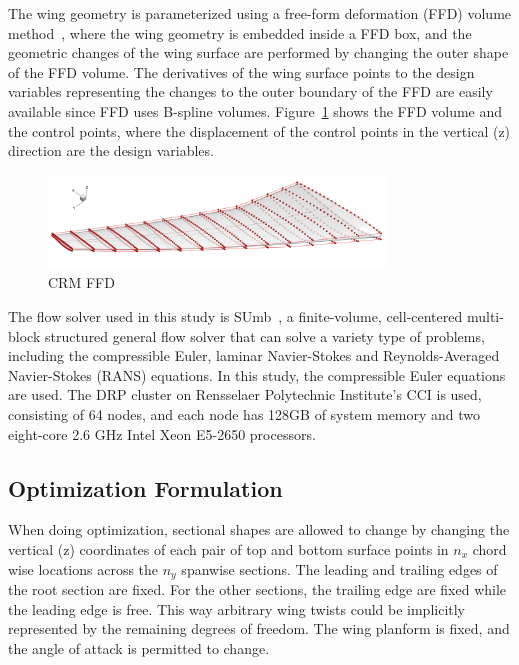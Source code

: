 The wing geometry is parameterized using a free-form deformation (FFD) volume method~\cite{Kenway:2010:C}, where the wing geometry is embedded inside a FFD box, and the geometric changes of the wing surface are performed by changing the outer shape of the FFD volume. The derivatives of the wing surface points to the design variables representing the changes to the outer boundary of the FFD are easily available since FFD uses B-spline volumes. Figure~\ref{fig:crm_ffd} shows the FFD volume and the control points, where the displacement of the control points in the vertical (z) direction are the design variables. 

 \begin{figure}[tbp]
  \centering
  \includegraphics[clip,width=0.8\textwidth]{./figs/chap7_aso/CRM-wing-FFD.png}%
  \caption{CRM FFD \label{fig:crm_ffd}}
\end{figure}

The flow solver used in this study is SUmb~\cite{sumb_pdf}, a finite-volume, cell-centered multi-block structured general flow solver that can solve a variety type of problems, including the compressible Euler, laminar Navier-Stokes and Reynolds-Averaged Navier-Stokes (RANS) equations. In this study, the compressible Euler equations are used. The DRP cluster on Rensselaer Polytechnic Institute's CCI is used, consisting of 64 nodes, and each node has 128GB of system memory and two eight-core 2.6 GHz Intel Xeon E5-2650 processors. 

\subsection{Optimization Formulation}
When doing optimization, sectional shapes are allowed to change by changing the vertical (z) coordinates 
of each pair of top and bottom surface points in $n_x$ chord wise locations across the $n_y$ spanwise sections. The leading and trailing edges of the root section are fixed. For the other sections, the trailing edge are fixed while the leading edge is free. This way arbitrary wing twists could be implicitly represented by the remaining degrees of freedom. The wing planform is fixed, and the angle of attack is permitted to change.  

